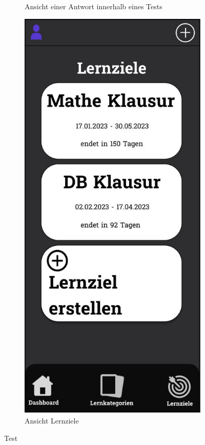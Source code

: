 \begin{figure}[htbp]
\begin{subfigure}[b]{0.45\linewidth}
    \caption{Ansicht einer Antwort innerhalb eines Tests}
    \label{fig:test-antwort}
  \end{subfigure}
  \hfill
  \begin{subfigure}[b]{0.45\linewidth}
    \centering
    \includegraphics[width=\linewidth]{images/Mockups/Lernziele.JPG}
    \caption{Ansicht Lernziele}
    \label{fig:lernziele}
  \end{subfigure}
  \caption{Test}
\end{figure}

